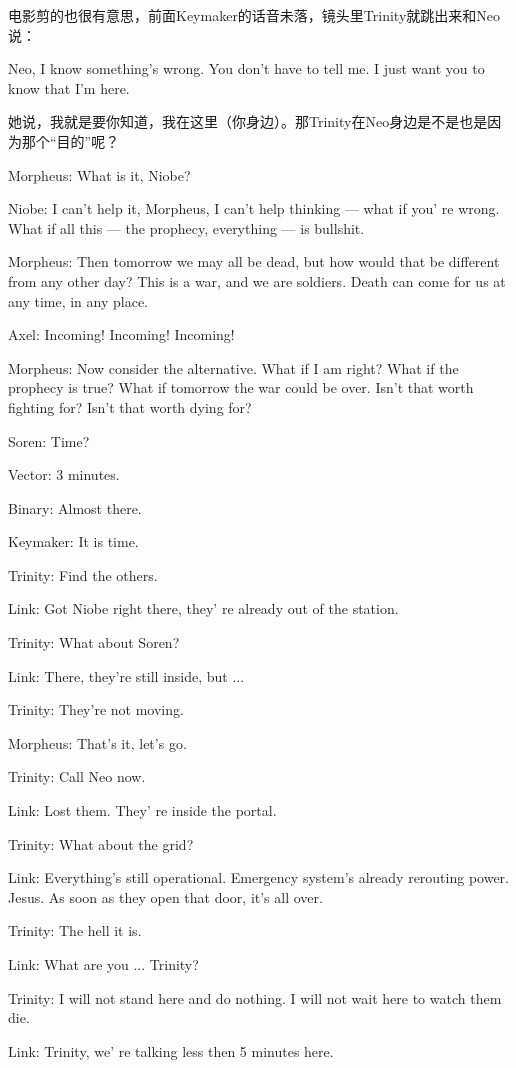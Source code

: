\documentclass{ctexart}
\newenvironment{myquote}{\color{green} \setlength{\leftskip}{6em} \setlength{\rightskip}{4em} \setlength{\parindent}{-2em}}{\par}
\begin{document}
电影剪的也很有意思，前面Keymaker的话音未落，镜头里Trinity就跳出来和Neo说：

Neo, I know something's wrong. You don't have to tell me. I just want you to know that I'm here.

她说，我就是要你知道，我在这里（你身边）。那Trinity在Neo身边是不是也是因为那个“目的”呢？

\begin{myquote}
Morpheus: What is it, Niobe?

Niobe: I can't help it, Morpheus, I can't help thinking --- what if you' re wrong. What if all this --- the prophecy, everything --- is bullshit.

Morpheus: Then tomorrow we may all be dead, but how would that be different from any other day? This is a war, and we are soldiers. Death can come for us at any time, in any place.

Axel: Incoming! Incoming! Incoming!

Morpheus: Now consider the alternative. What if I am right? What if the prophecy is true? What if tomorrow the war could be over. Isn't that worth fighting for? Isn't that worth dying for?

Soren: Time?

Vector: 3 minutes.

Binary: Almost there.

Keymaker: It is time.

Trinity: Find the others.

Link: Got Niobe right there, they' re already out of the station.

Trinity: What about Soren?

Link: There, they're still inside, but ...

Trinity: They're not moving.

Morpheus: That's it, let's go.

Trinity: Call Neo now.

Link: Lost them. They' re inside the portal.

Trinity: What about the grid?

Link: Everything's still operational. Emergency system's already rerouting power. Jesus. As soon as they open that door, it's all over.

Trinity: The hell it is.

Link: What are you ... Trinity?

Trinity: I will not stand here and do nothing. I will not wait here to watch them die.

Link: Trinity, we' re talking less then 5 minutes here.


\end{myquote}
\end{document}
